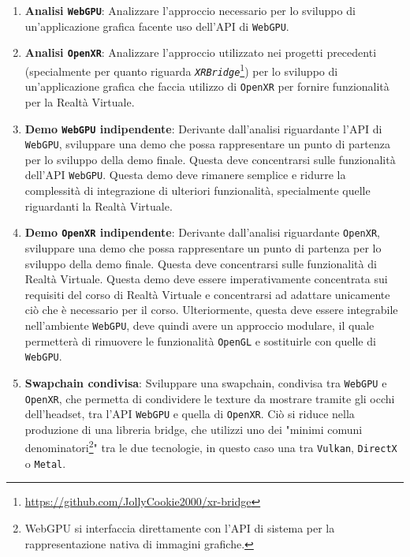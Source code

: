 \documentclass[a4paper, 11pt, twoside]{report}
\begin{document}
\begin{enumerate}
    \item \textbf{Analisi \texttt{WebGPU}}: Analizzare l'approccio necessario per lo sviluppo di un'applicazione grafica
        facente uso dell'API di \texttt{WebGPU}.
    \item \textbf{Analisi \texttt{\gls{OpenXR}}}: Analizzare l'approccio utilizzato nei progetti precedenti 
        (specialmente per quanto riguarda \textit{\texttt{XRBridge}}\footnote{\url{https://github.com/JollyCookie2000/xr-bridge}})
        per lo sviluppo di un'applicazione grafica che faccia utilizzo di \texttt{\gls{OpenXR}} per fornire funzionalità
        per la Realtà Virtuale.
    \item \textbf{Demo \texttt{WebGPU} indipendente}: Derivante dall'analisi riguardante l'API di \texttt{WebGPU},
        sviluppare una demo che possa rappresentare un punto di partenza per lo sviluppo della demo finale. Questa
        deve concentrarsi sulle funzionalità dell'API \texttt{WebGPU}. Questa demo deve rimanere semplice e ridurre la
        complessità di integrazione di ulteriori funzionalità, specialmente quelle riguardanti la Realtà Virtuale.
    \item \textbf{Demo \texttt{\gls{OpenXR}} indipendente}: Derivante dall'analisi riguardante \texttt{\gls{OpenXR}},
        sviluppare una demo che possa rappresentare un punto di partenza per lo sviluppo della demo finale. Questa deve
        concentrarsi sulle funzionalità di Realtà Virtuale. Questa demo deve essere imperativamente concentrata sui
        requisiti del corso di Realtà Virtuale e concentrarsi ad adattare unicamente ciò che è necessario per il corso.
        Ulteriormente, questa deve essere integrabile nell'ambiente \texttt{WebGPU}, deve quindi avere un approccio 
        modulare, il quale permetterà di rimuovere le funzionalità \texttt{OpenGL} e sostituirle con quelle di
        \texttt{WebGPU}.
    \item \textbf{Swapchain condivisa}: Sviluppare una swapchain, condivisa tra \texttt{WebGPU} e \texttt{\gls{OpenXR}},
        che permetta di condividere le texture da mostrare tramite gli occhi dell'headset, tra l'API \texttt{WebGPU} e
        quella di \texttt{\gls{OpenXR}}. Ciò si riduce nella produzione di una libreria bridge, che utilizzi uno dei
        "minimi comuni denominatori\footnote{WebGPU si interfaccia direttamente con l'API di sistema per la
        rappresentazione nativa di immagini grafiche.}" tra le due tecnologie, in questo caso una tra
        \texttt{\gls{Vulkan}}, \texttt{\gls{DirectX}} o \texttt{\gls{Metal}}.

\end{enumerate}
\end{document}

